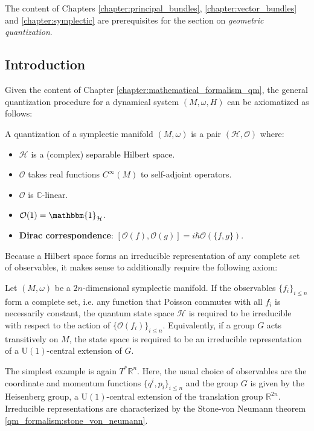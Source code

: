 \chapter{}\label{chapter:quantization}

    The content of Chapters \ref{chapter:principal_bundles}, \ref{chapter:vector_bundles} and \ref{chapter:symplectic} are prerequisites for the section on \textit{geometric quantization}.

\section{Introduction}

    Given the content of Chapter \ref{chapter:mathematical_formalism_qm}, the general quantization procedure for a dynamical system $(M,\omega,H)$ can be axiomatized as follows:
    \begin{method}\label{quantization:axioms}
        A quantization of a symplectic manifold $(M,\omega)$ is a pair $(\mathcal{H},\mathcal{O})$ where:
        \begin{itemize}
            \item $\mathcal{H}$ is a (complex) separable Hilbert space.
            \item $\mathcal{O}$ takes real functions $C^\infty(M)$ to self-adjoint operators.
            \item $\mathcal{O}$ is $\mathbb{C}$-linear.
            \item $\mathcal{O}(1) = \mathbbm{1}_{\mathcal{H}}$.
            \item \textbf{Dirac correspondence}: $[\mathcal{O}(f),\mathcal{O}(g)] = i\hbar\mathcal{O}(\{f,g\})$.
        \end{itemize}
    \end{method}

    Because a Hilbert space forms an irreducible representation of any complete set of observables, it makes sense to additionally require the following axiom:
    \begin{axiom}
        Let $(M,\omega)$ be a $2n$-dimensional symplectic manifold. If the observables $\{f_i\}_{i\leq n}$ form a complete set, i.e. any function that Poisson commutes with all $f_i$ is necessarily constant, the quantum state space $\mathcal{H}$ is required to be irreducible with respect to the action of $\{\mathcal{O}(f_i)\}_{i\leq n}$. Equivalently, if a group $G$ acts transitively on $M$, the state space is required to be an irreducible representation of a $\mathrm{U}(1)$-central extension of $G$.
    \end{axiom}
    The simplest example is again $T^*\mathbb{R}^n$. Here, the usual choice of observables are the coordinate and momentum functions $\{q^i,p_i\}_{i\leq n}$ and the group $G$ is given by the Heisenberg group, a $\mathrm{U}(1)$-central extension of the translation group $\mathbb{R}^{2n}$. Irreducible representations are characterized by the Stone-von Neumann theorem \ref{qm_formalism:stone_von_neumann}.

